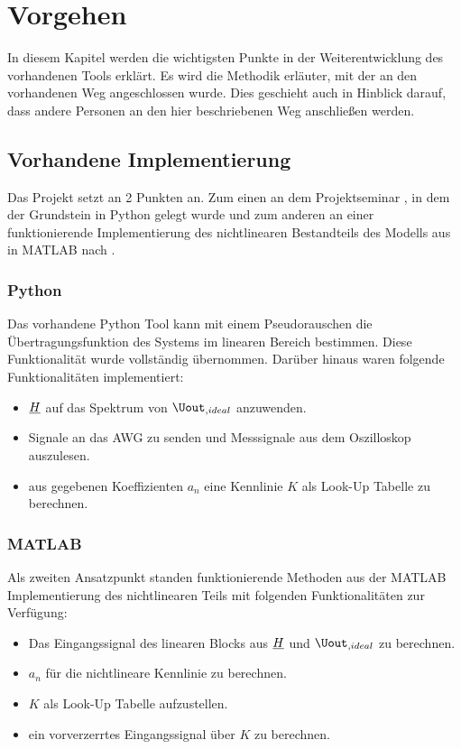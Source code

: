 \documentclass[../Report.tex]{subfiles}
\begin{document}
\chapter{Vorgehen}
\label{chap:vorgehen}
In diesem Kapitel werden die wichtigsten Punkte in der Weiterentwicklung des vorhandenen Tools erklärt. Es wird die Methodik erläuter, mit der an den vorhandenen Weg angeschlossen wurde. Dies geschieht auch in Hinblick darauf, dass andere Personen an den hier beschriebenen Weg anschließen werden.
\section[Vorhandene Implementierung]{Vorhandene Implementierung}
\label{sec:vorg.setup}
Das Projekt setzt an 2 Punkten an. Zum einen an dem Projektseminar \cite{PJS_Denys}, in dem der Grundstein in Python gelegt wurde und zum anderen an einer funktionierende Implementierung des nichtlinearen Bestandteils des Modells aus  in MATLAB nach \cite{harzheim}.
\subsection{Python}
\label{sec:vorg.python}
Das vorhandene Python Tool kann mit einem Pseudorauschen die Übertragungsfunktion des Systems im linearen Bereich bestimmen. Diese Funktionalität wurde vollständig übernommen. Darüber hinaus waren folgende Funktionalitäten implementiert:
\begin{itemize}
	\item	$\underline{H}$ auf das Spektrum von $\Uout_{,ideal}$ anzuwenden.
	
	\item	Signale an das AWG zu senden und Messsignale aus dem Oszilloskop auszulesen.
	
	\item	aus gegebenen Koeffizienten $a_n$ eine Kennlinie $K$ als Look-Up Tabelle zu berechnen.
\end{itemize}
\subsection{MATLAB}
\label{sec:vorg.matlab}
Als zweiten Ansatzpunkt standen funktionierende Methoden aus der MATLAB Implementierung des nichtlinearen Teils mit folgenden Funktionalitäten zur Verfügung:
\begin{itemize}
	\item	Das Eingangssignal des linearen Blocks aus $\underline{H}$ und $\Uout_{,ideal}$ zu berechnen.
	
	\item	$a_n$ für die nichtlineare Kennlinie zu berechnen.
	
	\item	$K$ als Look-Up Tabelle aufzustellen.
	
	\item	ein vorverzerrtes Eingangssignal über $K$ zu berechnen.
\end{itemize}
\end{document}
